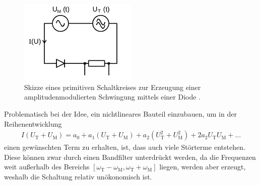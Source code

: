 \begin{figure}
  \centering
  \includegraphics[height=4cm]{JasperErsterSchultag/primamplmodschaltung.png}
  \caption{Skizze eines primitiven Schaltkreises zur Erzeugung einer amplitudenmodulierten Schwingung mittels einer Diode \cite{anleitung}.}
  \label{fig:primamplmodschaltung}
\end{figure}

Problematisch bei der Idee, ein nichtlineares Bauteil einzubauen, um in der Reihenentwicklung
\begin{align}
  I(U_\text{T} + U_\text{M}) = a_0 + a_1 (U_\text{T} + U_\text{M}) + a_2 (U_\text{T}^2 + U_\text{M}^2) + 2 a_2 U_\text{T} U_\text{M} + ...
\end{align}
einen gewünschten Term zu erhalten, ist, dass auch viele Störterme entstehen.
Diese können zwar durch einen Bandfilter unterdrückt werden, da die Frequenzen  weit außerhalb des Bereichs
$[\omega_\text{T} - \omega_\text{M},\omega_\text{T} + \omega_\text{M}]$ liegen, werden aber erzeugt,
weshalb die Schaltung relativ unökonomisch ist.

